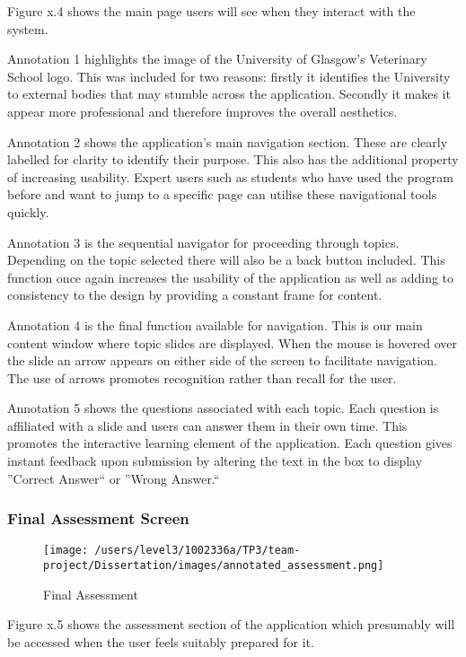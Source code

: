 \documentclass{l3proj}
\begin{document}
Figure x.4 shows the main page users will see when they interact with the system.

Annotation 1 highlights the image of the University of Glasgow's Veterinary School logo. This was included for two reasons: firstly it identifies the University to external bodies that may stumble across the application. Secondly it makes it appear more professional and therefore improves the overall aesthetics.

Annotation 2 shows the application's main navigation section. These are clearly labelled for clarity to identify their purpose. This also has the additional property of increasing usability. Expert users such as students who have used the program before and want to jump to a specific page can utilise these navigational tools quickly.

Annotation 3 is the sequential navigator for proceeding through topics. Depending on the topic selected there will also be a back button included. This function once again increases the usability of the application as well as adding to consistency to the design by providing a constant frame for content.

Annotation 4 is the final function available for navigation. This is our main content window where topic slides are displayed. When the mouse is hovered over the slide an arrow appears on either side of the screen to facilitate navigation. The use of arrows promotes recognition rather than recall for the user. 

Annotation 5 shows the questions associated with each topic. Each question is affiliated with a slide and users can answer them in their own time. This promotes the interactive learning element of the application. Each question gives instant feedback upon submission by altering the text in the box to display ''Correct Answer`` or ''Wrong Answer.`` 

\subsubsection{Final Assessment Screen}

\begin{figure}[!htb]
\caption{Final Assessment}
\texttt{[image: /users/level3/1002336a/TP3/team-project/Dissertation/images/annotated\_assessment.png]}
\end{figure}

Figure x.5 shows the assessment section of the application which presumably will be accessed when the user feels suitably prepared for it.
\end{document}
